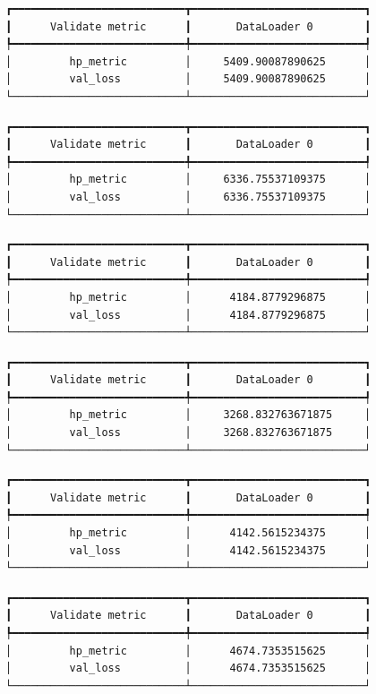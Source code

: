 \documentclass[
  letterpaper,
  DIV=11,
  numbers=noendperiod]{scrreprt}
\begin{document}
\begin{verbatim}
┏━━━━━━━━━━━━━━━━━━━━━━━━━━━┳━━━━━━━━━━━━━━━━━━━━━━━━━━━┓
┃      Validate metric      ┃       DataLoader 0        ┃
┡━━━━━━━━━━━━━━━━━━━━━━━━━━━╇━━━━━━━━━━━━━━━━━━━━━━━━━━━┩
│         hp_metric         │     5409.90087890625      │
│         val_loss          │     5409.90087890625      │
└───────────────────────────┴───────────────────────────┘
\end{verbatim}

\begin{verbatim}
┏━━━━━━━━━━━━━━━━━━━━━━━━━━━┳━━━━━━━━━━━━━━━━━━━━━━━━━━━┓
┃      Validate metric      ┃       DataLoader 0        ┃
┡━━━━━━━━━━━━━━━━━━━━━━━━━━━╇━━━━━━━━━━━━━━━━━━━━━━━━━━━┩
│         hp_metric         │     6336.75537109375      │
│         val_loss          │     6336.75537109375      │
└───────────────────────────┴───────────────────────────┘
\end{verbatim}

\begin{verbatim}
┏━━━━━━━━━━━━━━━━━━━━━━━━━━━┳━━━━━━━━━━━━━━━━━━━━━━━━━━━┓
┃      Validate metric      ┃       DataLoader 0        ┃
┡━━━━━━━━━━━━━━━━━━━━━━━━━━━╇━━━━━━━━━━━━━━━━━━━━━━━━━━━┩
│         hp_metric         │      4184.8779296875      │
│         val_loss          │      4184.8779296875      │
└───────────────────────────┴───────────────────────────┘
\end{verbatim}

\begin{verbatim}
┏━━━━━━━━━━━━━━━━━━━━━━━━━━━┳━━━━━━━━━━━━━━━━━━━━━━━━━━━┓
┃      Validate metric      ┃       DataLoader 0        ┃
┡━━━━━━━━━━━━━━━━━━━━━━━━━━━╇━━━━━━━━━━━━━━━━━━━━━━━━━━━┩
│         hp_metric         │     3268.832763671875     │
│         val_loss          │     3268.832763671875     │
└───────────────────────────┴───────────────────────────┘
\end{verbatim}

\begin{verbatim}
┏━━━━━━━━━━━━━━━━━━━━━━━━━━━┳━━━━━━━━━━━━━━━━━━━━━━━━━━━┓
┃      Validate metric      ┃       DataLoader 0        ┃
┡━━━━━━━━━━━━━━━━━━━━━━━━━━━╇━━━━━━━━━━━━━━━━━━━━━━━━━━━┩
│         hp_metric         │      4142.5615234375      │
│         val_loss          │      4142.5615234375      │
└───────────────────────────┴───────────────────────────┘
\end{verbatim}

\begin{verbatim}
┏━━━━━━━━━━━━━━━━━━━━━━━━━━━┳━━━━━━━━━━━━━━━━━━━━━━━━━━━┓
┃      Validate metric      ┃       DataLoader 0        ┃
┡━━━━━━━━━━━━━━━━━━━━━━━━━━━╇━━━━━━━━━━━━━━━━━━━━━━━━━━━┩
│         hp_metric         │      4674.7353515625      │
│         val_loss          │      4674.7353515625      │
└───────────────────────────┴───────────────────────────┘
\end{verbatim}
\end{document}
